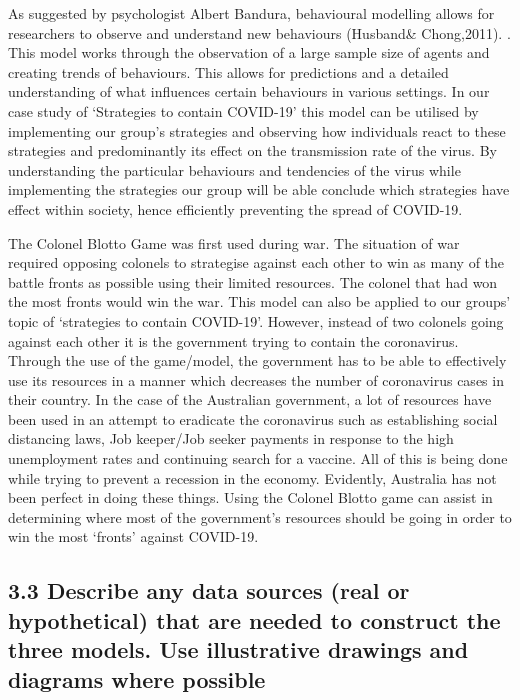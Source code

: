 \documentclass[11pt]{article}
\begin{document}
    As suggested by psychologist Albert Bandura, behavioural modelling
allows for researchers to observe and understand new behaviours
(Husband\& Chong,2011). . This model works through the observation of a
large sample size of agents and creating trends of behaviours. This
allows for predictions and a detailed understanding of what influences
certain behaviours in various settings. In our case study of `Strategies
to contain COVID-19' this model can be utilised by implementing our
group's strategies and observing how individuals react to these
strategies and predominantly its effect on the transmission rate of the
virus. By understanding the particular behaviours and tendencies of the
virus while implementing the strategies our group will be able conclude
which strategies have effect within society, hence efficiently
preventing the spread of COVID-19.

    The Colonel Blotto Game was first used during war. The situation of war
required opposing colonels to strategise against each other to win as
many of the battle fronts as possible using their limited resources. The
colonel that had won the most fronts would win the war. This model can
also be applied to our groups' topic of `strategies to contain
COVID-19'. However, instead of two colonels going against each other it
is the government trying to contain the coronavirus. Through the use of
the game/model, the government has to be able to effectively use its
resources in a manner which decreases the number of coronavirus cases in
their country. In the case of the Australian government, a lot of
resources have been used in an attempt to eradicate the coronavirus such
as establishing social distancing laws, Job keeper/Job seeker payments
in response to the high unemployment rates and continuing search for a
vaccine. All of this is being done while trying to prevent a recession
in the economy. Evidently, Australia has not been perfect in doing these
things. Using the Colonel Blotto game can assist in determining where
most of the government's resources should be going in order to win the
most `fronts' against COVID-19.

    \hypertarget{describe-any-data-sources-real-or-hypothetical-that-are-needed-to-construct-the-three-models.-use-illustrative-drawings-and-diagrams-where-possible}{%
\subsection{3.3 Describe any data sources (real or hypothetical) that
are needed to construct the three models. Use illustrative drawings and
diagrams where
possible}\label{describe-any-data-sources-real-or-hypothetical-that-are-needed-to-construct-the-three-models.-use-illustrative-drawings-and-diagrams-where-possible}}
\end{document}
